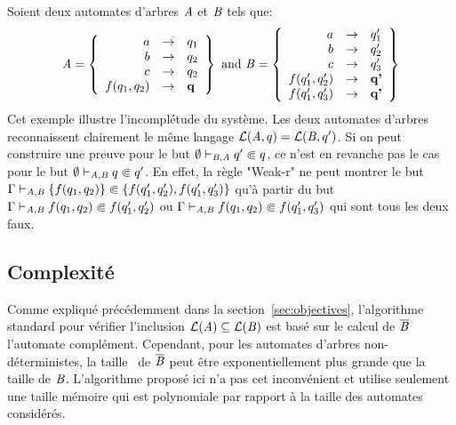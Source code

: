 \begin{example}
  Soient deux automates d'arbres $\mathit A$ et $\mathit B$ tels que:
  \[\mathit A = \left\{ 
    \begin{array}{rcl}
      a& \rightarrow &q_1\\
      b& \rightarrow &q_2\\
      c& \rightarrow &q_2\\
      f(q_1, q_2)&\rightarrow &{\textbf q}\\
    \end{array}\right\}
  \textrm { and }
  \mathit B = \left\{ 
    \begin{array}{rcl}
      a& \rightarrow &q_1'\\
      b& \rightarrow &q_2'\\
      c& \rightarrow &q_3'\\
      f(q_1', q_2')&\rightarrow &\textbf{q'}\\
      f(q_1', q_3')&\rightarrow &\textbf{q'}\\
    \end{array}\right\}
  \]
  Cet exemple illustre l'incomplétude du système. Les deux automates d'arbres reconnaissent 
  clairement le même langage $\mathcal{L}(\mathit A, q) = \mathcal{L}(\mathit B, q')$. Si on peut construire une preuve pour le but $\emptyset \vdash_{\mathit B, \mathit A} q' \Subset q$,
  ce n'est en revanche pas le cas pour le but $\emptyset \vdash_{\mathit A, \mathit B} q \Subset q'$. En effet, la règle "Weak-r" ne peut montrer 
  le but $\Gamma \vdash_{\mathit A, \mathit B} \{f(q_1, q_2)\} \Subset \{f(q_1', q_2'), f(q_1', q_3')\}$ qu'à partir du but $\Gamma \vdash_{\mathit A, \mathit B} f(q_1, q_2) \Subset f(q_1', q_2')$
  ou $\Gamma \vdash_{\mathit A, \mathit B} f(q_1, q_2) \Subset f(q_1', q_3')$ qui sont tous les deux faux.
\end{example}



\subsection{Complexité}
Comme expliqué précédemment dans la section~\ref{sec:objectives}, l'algorithme standard pour
vérifier l'inclusion $\mathcal{L}(\mathit A) \subseteq \mathcal{L}(\mathit B)$ est basé sur le calcul de $\overline{\mathit B}$ l'automate complément.
Cependant, pour les automates d'arbres non-déterministes, la taille~\cite{TATA} de $\overline{\mathit B}$ peut être exponentiellement plus grande
que la taille de $\mathit B$. L'algorithme proposé ici n'a pas cet inconvénient et utilise seulement
une taille mémoire qui est polynomiale par rapport à la taille des automates considérés.

